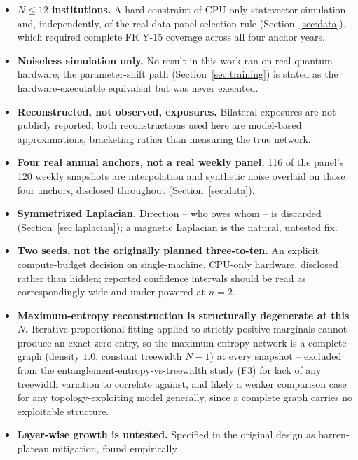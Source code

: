 \documentclass[journal]{IEEEtran}
\begin{document}
\begin{itemize}
  \item \textbf{$N \le 12$ institutions.} A hard constraint of CPU-only
        statevector simulation and, independently, of the real-data
        panel-selection rule (Section~\ref{sec:data}), which required
        complete FR Y-15 coverage across all four anchor years.
  \item \textbf{Noiseless simulation only.} No result in this work ran
        on real quantum hardware; the parameter-shift path
        (Section~\ref{sec:training}) is stated as the hardware-executable
        equivalent but was never executed.
  \item \textbf{Reconstructed, not observed, exposures.} Bilateral
        exposures are not publicly reported; both reconstructions used
        here are model-based approximations, bracketing rather than
        measuring the true network.
  \item \textbf{Four real annual anchors, not a real weekly panel.} 116
        of the panel's 120 weekly snapshots are interpolation and
        synthetic noise overlaid on those four anchors, disclosed
        throughout (Section~\ref{sec:data}).
  \item \textbf{Symmetrized Laplacian.} Direction -- who owes whom -- is
        discarded (Section~\ref{sec:laplacian}); a magnetic Laplacian is
        the natural, untested fix.
  \item \textbf{Two seeds, not the originally planned three-to-ten.} An
        explicit compute-budget decision on single-machine, CPU-only
        hardware, disclosed rather than hidden; reported confidence
        intervals should be read as correspondingly wide and
        under-powered at $n=2$.
  \item \textbf{Maximum-entropy reconstruction is structurally
        degenerate at this $N$.} Iterative proportional fitting applied
        to strictly positive marginals cannot produce an exact zero
        entry, so the maximum-entropy network is a complete graph
        (density $1.0$, constant treewidth $N-1$) at every snapshot --
        excluded from the entanglement-entropy-vs-treewidth study (F3)
        for lack of any treewidth variation to correlate against, and
        likely a weaker comparison case for any topology-exploiting
        model generally, since a complete graph carries no exploitable
        structure.
  \item \textbf{Layer-wise growth is untested.} Specified in the original
        design as barren-plateau mitigation, found empirically

\end{itemize}
\end{document}
